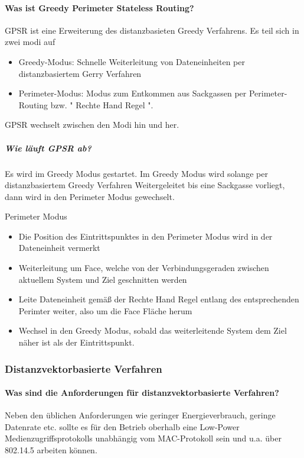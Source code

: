 	\paragraph{Was ist Greedy Perimeter Stateless Routing?}
		GPSR ist eine Erweiterung des distanzbasieten Greedy Verfahrens. Es teil sich in zwei modi auf
		\begin{itemize}
			\item Greedy-Modus: Schnelle Weiterleitung von Dateneinheiten per distanzbasiertem Gerry Verfahren
			\item Perimeter-Modus: Modus zum Entkommen aus Sackgassen per Perimeter-Routing bzw. " Rechte Hand Regel ".
		\end{itemize}
		GPSR wechselt zwischen den Modi hin und her.
	\subparagraph{Wie läuft GPSR ab?}
	Es wird im Greedy Modus gestartet. Im Greedy Modus wird solange per distanzbasiertem Greedy Verfahren Weitergeleitet bis eine Sackgasse vorliegt, dann wird in den Perimeter Modus gewechselt.
	
	Perimeter Modus
	\begin{itemize}
		\item Die Position des Eintrittspunktes in den Perimeter Modus wird in der Dateneinheit vermerkt
		\item Weiterleitung um Face, welche von der Verbindungsgeraden zwischen aktuellem System und Ziel geschnitten werden
		\item Leite Dateneinheit gemäß der Rechte Hand Regel entlang des entsprechenden Perimter weiter, also um die Face Fläche herum
		\item Wechsel in den Greedy Modus, sobald das weiterleitende System dem Ziel näher ist als der Eintrittspunkt.
	\end{itemize}
	
	\subsubsection{Distanzvektorbasierte Verfahren}
	
	\paragraph{Was sind die Anforderungen für distanzvektorbasierte Verfahren?}
	Neben den üblichen Anforderungen wie geringer Energieverbrauch, geringe Datenrate etc.  sollte es für den Betrieb oberhalb eine Low-Power Medienzugriffsprotokolls  unabhängig vom MAC-Protokoll sein und u.a. über 802.14.5 arbeiten können.
